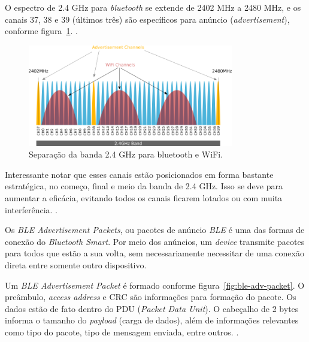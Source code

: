 O espectro de 2.4 GHz para \textit{bluetooth} se extende de 2402 MHz a 2480 MHz, e os canais 37, 38 e 39 (últimos três) são específicos para anúncio (\textit{advertisement}), conforme figura~\ref{fig:banda-channels}.  \cite{ble-packets}. 

\begin{figure}[htb]
	\caption{\label{fig:banda-channels}Separação da banda 2.4 GHz para bluetooth e WiFi.}
	\begin{center}
		\includegraphics[width=0.8\textwidth]{img/banda-2-4.png}
	\end{center}
\end{figure}

Interessante notar que esses canais estão posicionados em forma bastante estratégica, no começo, final e meio da banda de 2.4 GHz. Isso se deve para aumentar a eficácia, evitando todos os canais ficarem lotados ou com muita interferência. \cite{ble-packets}. 

Os \textit{BLE Advertisement Packets}, ou pacotes de anúncio \textit{BLE} é uma das formas de conexão do \textit{Bluetooth Smart}. Por meio dos anúncios, um \textit{device} transmite pacotes para todos que estão a sua volta, sem necessariamente necessitar de uma conexão direta entre somente outro dispositivo.

Um \textit{BLE Advertisement Packet} é formado conforme figura~\ref{fig:ble-adv-packet}. O preâmbulo, \textit{access address} e CRC são informações para formação do pacote. Os dados estão de fato dentro do PDU (\textit{Packet Data Unit}). O cabeçalho de 2 bytes informa o tamanho do \textit{payload} (carga de dados), além de informações relevantes como tipo do pacote, tipo de mensagem enviada, entre outros. \cite{ble-packets}.


